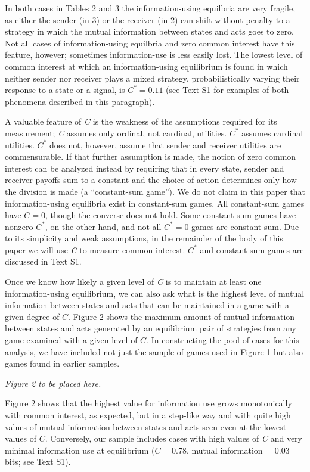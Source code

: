 \documentclass[10pt]{article}
\begin{document}
In both cases in Tables 2 and 3 the information-using equilbria are very
fragile, as either the sender (in 3) or the receiver (in 2) can shift
without penalty to a strategy in which the mutual information between
states and acts goes to zero. Not all cases of information-using
equilbria and zero common interest have this feature, however; sometimes
information-use is less easily lost. The lowest level of common interest
at which an information-using equilibrium is found in which neither
sender nor receiver plays a mixed strategy, probabilistically varying
their response to a state or a signal, is $C^*=0.11$ (see Text S1 for examples of both phenomena described in this paragraph).

A valuable feature of \emph{C} is the weakness of the assumptions
required for its measurement; \emph{C} assumes only ordinal, not
cardinal, utilities. $C^*$ assumes cardinal utilities. $C^*$ does not,
however, assume that sender and receiver utilities are commensurable. If
that further assumption is made, the notion of zero common interest can
be analyzed instead by requiring that in every state, sender and
receiver payoffs sum to a constant and the choice of action determines
only how the division is made (a ``constant-sum game''). We do not claim
in this paper that information-using equilibria exist in constant-sum
games. All constant-sum games have $C=0$, though the converse does not
hold. Some constant-sum games have nonzero $C^*$, on the other hand, and
not all $C^*=0$ games are constant-sum. Due to its simplicity and weak
assumptions, in the remainder of the body of this paper we will use
\emph{C} to measure common interest. $C^*$ and constant-sum games are
discussed in Text S1.

Once we know how likely a given level of \emph{C} is to maintain at
least one information-using equilibrium, we can also ask what is the
highest level of mutual information between states and acts that can be
maintained in a game with a given degree of $C$. Figure 2 shows the
maximum amount of mutual information between states and acts generated
by an equilibrium pair of strategies from any game examined with a given
level of $C$. In constructing the pool of cases for this analysis, we have
included not just the sample of games used in Figure 1 but also games
found in earlier samples.

\emph{Figure 2 to be placed here.}

Figure 2 shows that the highest value for information use grows
monotonically with common interest, as expected, but in a step-like way
and with quite high values of mutual information between states and acts
seen even at the lowest values of $C$. Conversely, our sample includes
cases with high values of \emph{C} and very minimal information use at
equilibrium ($C=0.78$, mutual information = 0.03 bits; see Text S1).
\end{document}
